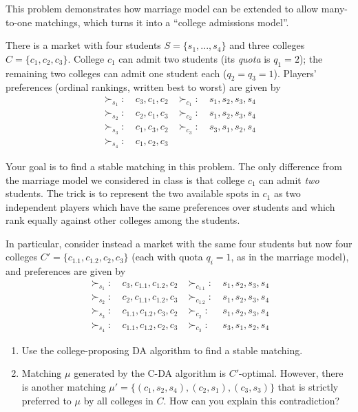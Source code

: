 \documentclass[a4paper]{article}
\begin{document}
	This problem demonstrates how marriage model can be extended to allow many-to-one matchings, which turns it into a ``college admissions model''.
	
	There is a market with four students $S = \{s_1, ..., s_4\}$ and three colleges $C= \{c_1, c_2, c_3\}$. College $c_1$ can admit two students (its \emph{quota} is $q_1=2$); the remaining two colleges can admit one student each ($q_2=q_3=1$). Players' preferences (ordinal rankings, written best to worst) are given by
	\begin{align*}
		\succ_{s_1}: &\ c_3, c_1, c_2	&	\succ_{c_1}: &\ s_1, s_2, s_3, s_4
		\\
		\succ_{s_2}: &\ c_2, c_1, c_3	&	\succ_{c_2}: &\ s_1, s_2, s_3, s_4
		\\
		\succ_{s_3}: &\ c_1, c_3, c_2	&	\succ_{c_3}: &\ s_3, s_1, s_2, s_4
		\\
		\succ_{s_4}: &\ c_1, c_2, c_3
	\end{align*}
	
	Your goal is to find a stable matching in this problem. The only difference from the marriage model we considered in class is that college $c_1$ can admit \emph{two} students. The trick is to represent the two available spots in $c_1$ as two independent players which have the same preferences over students and which rank equally against other colleges among the students.
	
	In particular, consider instead a market with the same four students but now four colleges $C' = \{c_{1.1}, c_{1.2}, c_2, c_3\}$ (each with quota $q_i=1$, as in the marriage model), and preferences are given by 
	\begin{align*}
		\succ_{s_1}: &\ c_3, c_{1.1}, c_{1.2}, c_2	&	\succ_{c_{1.1}}: &\ s_1, s_2, s_3, s_4
		\\
		\succ_{s_2}: &\ c_2, c_{1.1}, c_{1.2}, c_3	&	\succ_{c_{1.2}}: &\ s_1, s_2, s_3, s_4
		\\
		\succ_{s_3}: &\ c_{1.1}, c_{1.2}, c_3, c_2	&	\succ_{c_2}: &\ s_1, s_2, s_3, s_4
		\\
		\succ_{s_4}: &\ c_{1.1}, c_{1.2}, c_2, c_3	&	\succ_{c_3}: &\ s_3, s_1, s_2, s_4
	\end{align*}
	
	\begin{enumerate}
		\item Use the college-proposing DA algorithm to find a stable matching.
		\item Matching $\mu$ generated by the C-DA algorithm is $C'$-optimal. However, there is another matching $\mu' = \{ (c_1, s_2, s_4), (c_2, s_1), (c_3, s_3) \}$ that is strictly preferred to $\mu$ by all colleges in $C$. How can you explain this contradiction?
	\end{enumerate}
\end{document}
